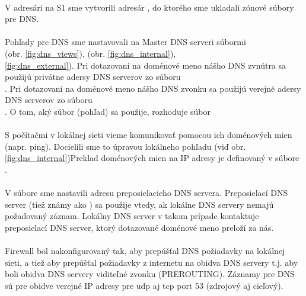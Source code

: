 \paragraph{}
V adresári  na S1 sme vytvorili adresár , do ktorého sme ukladali zónové súbory pre DNS.
\paragraph{}
Pohľady pre DNS sme nastavovali na Master DNS serveri súbormi\\  (obr. \ref{fig:dns_views}),  (obr. \ref{fig:dns_internal}),\\  \ref{fig:dns_external}). Pri dotazovaní na doménové meno nášho DNS zvnútra sa použijú privátne adersy DNS serverov zo súboru\\ . Pri dotazovaní na doménové meno nášho DNS zvonku sa použijú verejné adersy DNS serverov zo súboru\\ . O tom, aký súbor (pohľad) sa použije, rozhoduje súbor 
\paragraph{}
S počítačmi v lokálnej sieti vieme komunikovať pomocou ich doménových mien (napr. ping). Docielili sme to úpravou lokálneho pohľadu (viď obr. \ref{fig:dns_internal})Preklad doménových mien na IP adresy je definovaný v súbore\\ .
\paragraph{}
V súbore  sme nastavili adresu preposielacieho DNS servera. Preposielací DNS server (tiež známy ako ) sa použije vtedy, ak lokálne DNS servery nemajú požadovaný záznam. Lokálny DNS server v takom prípade kontaktuje preposielací DNS server, ktorý dotazované doménové meno preloží za nás.
\paragraph{}
Firewall bol nakonfigurovaný tak, aby prepúšťal DNS požiadavky na lokálnej sieti, a tiež aby prepúšťal požiadavky z internetu na obidva DNS servery t.j. aby boli obidva DNS servery viditeľné zvonku (PREROUTING). Záznamy pre DNS sú pre obidve verejné IP adresy pre udp aj tcp port 53 (zdrojový aj cieľový).

